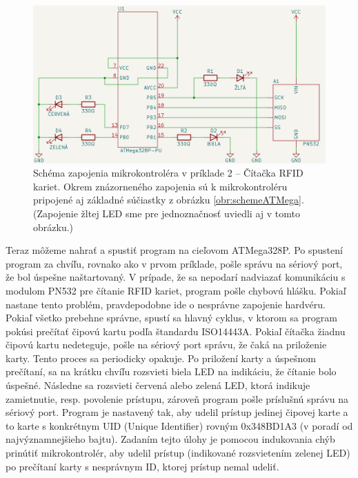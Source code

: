 \begin{figure}
    \centerline{\includegraphics[width=1\textwidth]{images/schemeRFID.png}}
    \caption[Schéma zapojenia mikrokontroléra v príklade 2]{Schéma zapojenia mikrokontroléra v príklade 2 -- Čítačka RFID kariet. Okrem znázorneného zapojenia sú k mikrokontroléru pripojené aj základné súčiastky z obrázku \ref{obr:schemeATMega}. (Zapojenie žltej LED sme pre jednoznačnosť uviedli aj v tomto obrázku.)}
    \label{obr:schemeRFID}
\end{figure}

Teraz môžeme nahrať a spustiť program na cieľovom ATMega328P. Po spustení program za chvíľu, rovnako ako v prvom príklade, pošle správu na sériový port, že bol úspešne naštartovaný. V prípade, že sa nepodarí nadviazať komunikáciu s modulom PN532 pre čítanie RFID kariet, program pošle chybovú hlášku. Pokiaľ nastane tento problém, pravdepodobne ide o nesprávne zapojenie hardvéru. Pokiaľ všetko prebehne správne, spustí sa hlavný cyklus, v ktorom sa program pokúsi prečítať čipovú kartu podľa štandardu ISO14443A. Pokiaľ čítačka žiadnu čipovú kartu nedeteguje, pošle na sériový port správu, že čaká na priloženie karty. Tento proces sa periodicky opakuje. Po priložení karty a úspešnom prečítaní, sa na krátku chvíľu rozsvieti biela LED na indikáciu, že čítanie bolo úspešné. Následne sa rozsvieti červená alebo zelená LED, ktorá indikuje zamietnutie, resp. povolenie prístupu, zároveň program pošle príslušnú správu na sériový port. Program je nastavený tak, aby udelil prístup jedinej čipovej karte a to karte s konkrétnym UID (Unique Identifier) rovným 0x348BD1A3 (v poradí od najvýznamnejšieho bajtu). Zadaním tejto úlohy je pomocou indukovania chýb prinútiť mikrokontrolér, aby udelil prístup (indikované rozsvietením zelenej LED) po prečítaní karty s nesprávnym ID, ktorej prístup nemal udeliť.


